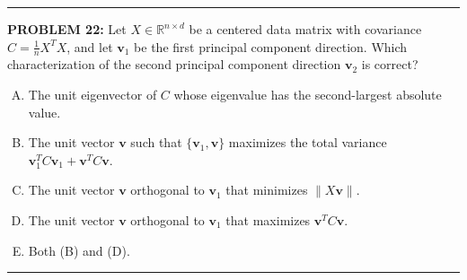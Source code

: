 \documentclass[12pt]{amsart}
\newcommand{\divider}{
  \vspace{-1em} %
  \noindent
  \raisebox{-0.15ex}{\textbullet}%
  \hspace{0.5em}%
  \rule[0.5ex]{0.95\textwidth}{1.0pt}%
  \hspace{0.5em}%
  \raisebox{-0.15ex}{\textbullet}%
  \vspace{0em} %
}
\begin{document}
\divider






{\bf PROBLEM 22:}
Let $X \in \mathbb{R}^{n \times d}$ be a centered data matrix with covariance 
$C = \frac{1}{n}X^TX$, and let $\mathbf{v}_1$ be the first principal component direction.
Which characterization of the second principal component direction $\mathbf{v}_2$ is correct?
\begin{enumerate}[(A)]
\item The unit eigenvector of $C$ whose eigenvalue has the second-largest absolute value.
\item The unit vector $\mathbf{v}$ such that $\{\mathbf{v}_1, \mathbf{v}\}$ maximizes the total variance $\mathbf{v}_1^T C \mathbf{v}_1 + \mathbf{v}^T C \mathbf{v}$.
\item The unit vector $\mathbf{v}$ orthogonal to $\mathbf{v}_1$ that minimizes $\|X\mathbf{v}\|$.
\item The unit vector $\mathbf{v}$ orthogonal to $\mathbf{v}_1$ that maximizes $\mathbf{v}^T C \mathbf{v}$.
\item Both (B) and (D).
\end{enumerate}
%
\divider
\end{document}
